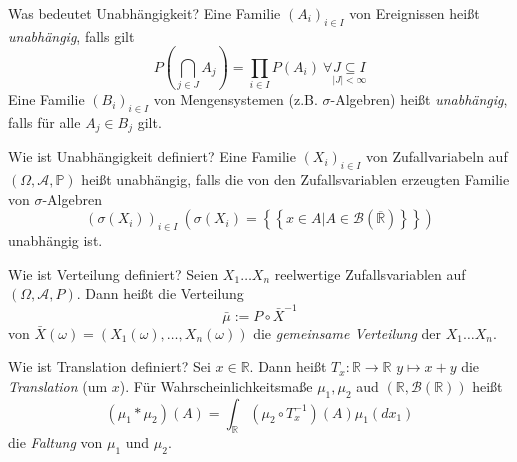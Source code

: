 \documentclass[avery5371,grid,frame]{flashcards} %
\newcommand{\1}{ \mathbb{1} } %
\begin{document}
\begin{flashcard}[Definition]{ Was bedeutet Unabhängigkeit?}
  Eine Familie $\left(A_{i}\right)_{i\in I}$ von Ereignissen heißt
  \emph{unabhängig}, falls gilt
  \begin{equation}
    P\left(\bigcap_{j\in J}A_{j}\right)=\prod_{i\in I}P\left(A_{i}\right)\ \forall\underset{\left|J\right|<\infty}{J\subseteq I}\label{eq:def1.1}
  \end{equation}
  Eine Familie $\left(B_{i}\right)_{i\in I}$ von Mengensystemen (z.B.
  $\sigma$-Algebren) heißt \emph{unabhängig}, falls für
  alle $A_{j}\in B_{j}$ gilt.
\end{flashcard}

\begin{flashcard}[Definition]{Wie ist Unabhängigkeit definiert?}
  Eine Familie $\left(X_{i}\right)_{i\in I}$ von Zufallvariabeln auf
  $\left(\Omega,\mathcal{A},\mathbb{P}\right)$ heißt unabhängig, falls
  die von den Zufallsvariablen erzeugten Familie von $\sigma$-Algebren
  \[
  \left(\sigma\left(X_{i}\right)\right)_{i\in I}\ \left(\sigma\left(X_{i}\right)=\left\{ \left\{ x\in A|A\in\mathcal{B}\left(\overline{\mathbb{R}}\right)\right\} \right\} \right)
  \]
  unabhängig ist.
\end{flashcard}

\begin{flashcard}[Definition]{Wie ist Verteilung definiert?}
  Seien $X_{1}\ldots X_{n}$ reelwertige Zufallsvariablen auf $\left(\Omega,\mathcal{A},P\right)$.
  Dann heißt die Verteilung 
  \[
  \bar{\mu}:=P\circ\bar{X}^{-1}
  \]
  von $\bar{X}\left(\omega\right)=\left(X_{1}\left(\omega\right),\ldots,X_{n}\left(\omega\right)\right)$
  die \emph{gemeinsame Verteilung} der
  $X_{1}\ldots X_{n}$.
\end{flashcard}

\begin{flashcard}[Definition]{Wie ist Translation definiert?}
  Sei $x\in\mathbb{R}$. Dann heißt 
   $ T_{x}:\mathbb{R}  \to  \mathbb{R}$
   $ y \mapsto x+y$
  die \emph{Translation} (um $x$). Für Wahrscheinlichkeitsmaße $\mu_{1},\mu_{2}$
  aud $\left(\mathbb{R},\mathcal{B}\left(\mathbb{R}\right)\right)$
  heißt 
  \[
  \left(\mu_{1}*\mu_{2}\right)\left(A\right)=\int_{\mathbb{R}}\left(\mu_{2}\circ T_{x}^{-1}\right)\left(A\right)\mu_{1}\left(dx_{1}\right)
  \]
  die \emph{Faltung} von $\mu_{1}$ und $\mu_{2}$.
\end{flashcard}
\end{document}

